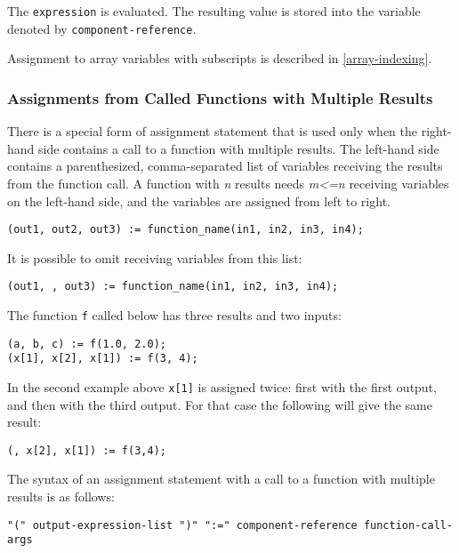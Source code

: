 The \lstinline[language=grammar]!expression! is evaluated.
The resulting value is stored into the variable denoted by \lstinline[language=grammar]!component-reference!.

Assignment to array variables with subscripts is described in \cref{array-indexing}.


\subsubsection{Assignments from Called Functions with Multiple Results}\label{assignments-from-called-functions-with-multiple-results}

There is a special form of assignment statement that is used only when
the right-hand side contains a call to a function with multiple results.
The left-hand side contains a parenthesized, comma-separated list of
variables receiving the results from the function call. A function with
\emph{n} results needs \emph{m\textless{}=n} receiving variables on the
left-hand side, and the variables are assigned from left to right.

\begin{lstlisting}[language=modelica]
(out1, out2, out3) := function_name(in1, in2, in3, in4);
\end{lstlisting}

It is possible to omit receiving variables from this list:
\begin{lstlisting}[language=modelica]
(out1, , out3) := function_name(in1, in2, in3, in4);
\end{lstlisting}

\begin{example}
The function \lstinline!f! called below has three results and two inputs:
\begin{lstlisting}[language=modelica]
(a, b, c) := f(1.0, 2.0);
(x[1], x[2], x[1]) := f(3, 4);
\end{lstlisting}
In the second example above \lstinline!x[1]! is assigned twice: first with the first output, and then with the third output.  For that case the following will give the same result:
\begin{lstlisting}[language=modelica]
(, x[2], x[1]) := f(3,4);
\end{lstlisting}
\end{example}

The syntax of an assignment statement with a call to a function with
multiple results is as follows:
\begin{lstlisting}[language=grammar]
"(" output-expression-list ")" ":=" component-reference function-call-args
\end{lstlisting}

